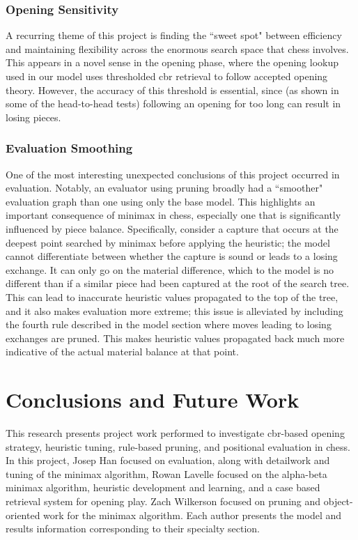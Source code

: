 \documentclass[letterpaper]{article}
\begin{document}
\subsubsection{Opening Sensitivity}
A recurring theme of this project is finding the ``sweet spot" between efficiency and maintaining flexibility across the enormous search space that chess involves.  This appears in a novel sense in the opening phase, where the opening lookup used in our model uses thresholded \acrshort{cbr} retrieval to follow accepted opening theory.  However, the accuracy of this threshold is essential, since (as shown in some of the head-to-head tests) following an opening for too long can result in losing pieces.

\subsubsection{Evaluation Smoothing}
One of the most interesting unexpected conclusions of this project occurred in evaluation.  Notably, an evaluator using pruning broadly had a ``smoother" evaluation graph than one using only the base model.  This highlights an important consequence of minimax in chess, especially one that is significantly influenced by piece balance.  Specifically, consider a capture that occurs at the deepest point searched by minimax before applying the heuristic; the model cannot differentiate between whether the capture is sound or leads to a losing exchange.  It can only go on the material difference, which to the model is no different than if a similar piece had been captured at the root of the search tree.  This can lead to inaccurate heuristic values propagated to the top of the tree, and it also makes evaluation more extreme; this issue is alleviated by including the fourth rule described in the model section where moves leading to losing exchanges are pruned.  This makes heuristic values propagated back much more indicative of the actual material balance at that point.

\section{Conclusions and Future Work}
This research presents project work performed to investigate \acrshort{cbr}-based opening strategy, heuristic tuning, rule-based pruning, and positional evaluation in chess.  In this project, Josep Han focused on evaluation, along with detailwork and tuning of the minimax algorithm, Rowan Lavelle focused on the alpha-beta minimax algorithm, heuristic development and learning, and a case based retrieval system for opening play. Zach Wilkerson focused on pruning and object-oriented work for the minimax algorithm.  Each author presents the model and results information corresponding to their specialty section.
\end{document}
